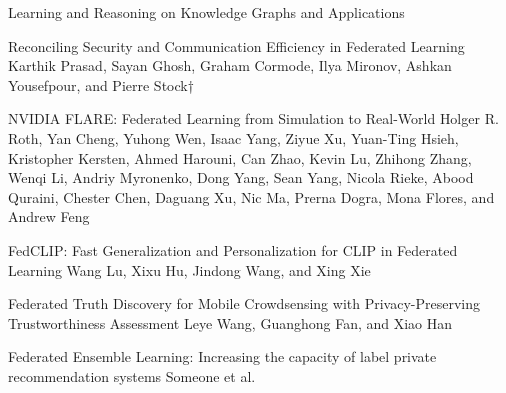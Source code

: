 \documentclass[11pt]{article}
\begin{document}
\begin{bulletin}
\begin{articlesection}{Learning and Reasoning on Knowledge Graphs and Applications}

% 


\begin{article}
{Reconciling Security and Communication Efficiency in Federated Learning}
{Karthik Prasad, Sayan Ghosh, Graham Cormode, Ilya Mironov, Ashkan Yousefpour, and Pierre Stock†}

\end{article}

\begin{article}
{NVIDIA FLARE: Federated Learning from Simulation to Real-World}
{Holger R. Roth,
Yan Cheng,
Yuhong Wen,
Isaac Yang,
Ziyue Xu,
Yuan-Ting Hsieh,
Kristopher Kersten,
Ahmed Harouni,
Can Zhao,
Kevin Lu,
Zhihong Zhang,
Wenqi Li,
Andriy Myronenko,
Dong Yang,
Sean Yang,
Nicola Rieke,
Abood Quraini,
Chester Chen,
Daguang Xu,
Nic Ma,
Prerna Dogra,
Mona Flores, and
Andrew Feng}

\end{article}


\begin{article}
{FedCLIP: Fast Generalization and Personalization for CLIP in Federated Learning}
{Wang Lu, Xixu Hu, Jindong Wang, and Xing Xie}

\end{article}


\begin{article}
{Federated Truth Discovery for Mobile Crowdsensing with Privacy-Preserving Trustworthiness Assessment}
{Leye Wang, Guanghong Fan, and Xiao Han}

\end{article}

\begin{article}
{Federated Ensemble Learning: Increasing the capacity of label private recommendation systems}
{Someone et al.}

\end{article}


\end{articlesection}
\end{bulletin}
\end{document}
